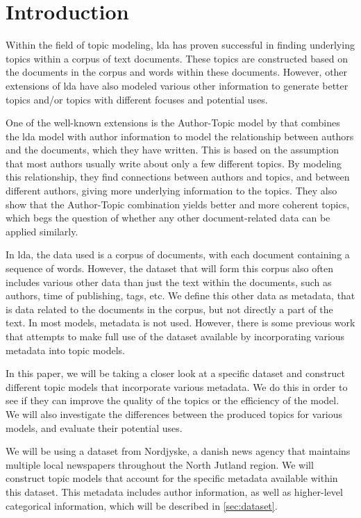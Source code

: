 \section{Introduction}\label{sec:introduction}
Within the field of topic modeling, \gls{lda} has proven successful in finding underlying topics within a corpus of text documents.
These topics are constructed based on the documents in the corpus and words within these documents. 
However, other extensions of \gls{lda} have also modeled various other information to generate better topics and/or topics with different focuses and potential uses.

One of the well-known extensions is the Author-Topic model by \citet{author_topic_2012} that combines the \gls{lda} model with author information to model the relationship between authors and the documents, which they have written.
This is based on the assumption that most authors usually write about only a few different topics.
By modeling this relationship, they find connections between authors and topics, and between different authors, giving more underlying information to the topics.
They also show that the Author-Topic combination yields better and more coherent topics, which begs the question of whether any other document-related data can be applied similarly.

In \gls{lda}, the data used is a corpus of documents, with each document containing a sequence of words.
However, the dataset that will form this corpus also often includes various other data than just the text within the documents, such as authors, time of publishing, tags, etc.
We define this other data as metadata, that is data related to the documents in the corpus, but not directly a part of the text.
In most models, metadata is not used.
However, there is some previous work that attempts to make full use of the dataset available by incorporating various metadata into topic models.

In this paper, we will be taking a closer look at a specific dataset and construct different topic models that incorporate various metadata.
We do this in order to see if they can improve the quality of the topics or the efficiency of the model.
We will also investigate the differences between the produced topics for various models, and evaluate their potential uses.

We will be using a dataset from Nordjyske, a danish news agency that maintains multiple local newspapers throughout the North Jutland region.
We will construct topic models that account for the specific metadata available within this dataset.
This metadata includes author information, as well as higher-level categorical information, which will be described in \autoref{sec:dataset}.

